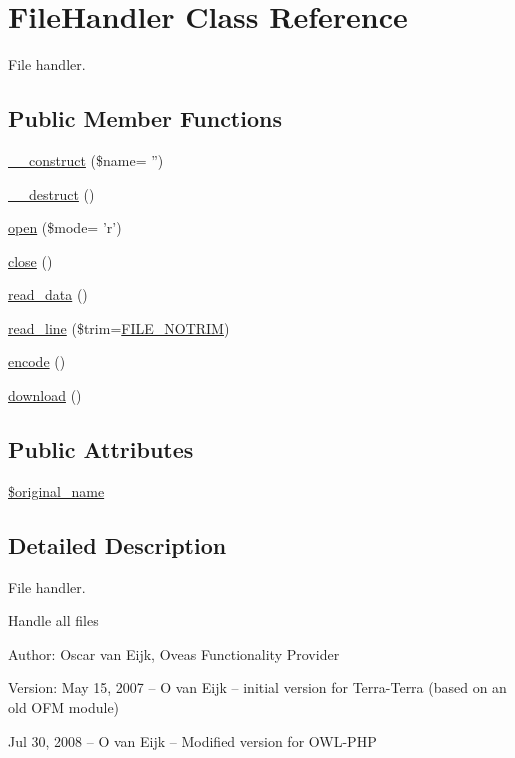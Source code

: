 \hypertarget{classFileHandler}{
\section{FileHandler Class Reference}
\label{classFileHandler}
}
File handler.  


\subsection*{Public Member Functions}
\begin{CompactItemize}
\item 
\hyperlink{classFileHandler_fe961e704bc637605512d72e6eb2ef82}{\_\-\_\-construct} (\$name= '')
\item 
\hyperlink{classFileHandler_734859e8962992da99dd8f853da5ae43}{\_\-\_\-destruct} ()
\item 
\hyperlink{classFileHandler_2a650b033c4eb1f98ba47fb05ce7b454}{open} (\$mode= 'r')
\item 
\hyperlink{classFileHandler_a48e7c3b67346e29b194d2f0ac5dd1f8}{close} ()
\item 
\hyperlink{classFileHandler_1389a6ea19a22471c301d70b5ed68ed8}{read\_\-data} ()
\item 
\hyperlink{classFileHandler_69f84a8138f717c84f560125f1f95448}{read\_\-line} (\$trim=\hyperlink{class_8filehandler_8php_3720f2e15eb9e16e29d8ecbb96763662}{FILE\_\-NOTRIM})
\item 
\hyperlink{classFileHandler_a29360bf94fd54d906256561f33d93ad}{encode} ()
\item 
\hyperlink{classFileHandler_c17edc9b92643c32ae6040b1235c64dd}{download} ()
\end{CompactItemize}
\subsection*{Public Attributes}
\begin{CompactItemize}
\item 
\hyperlink{classFileHandler_477708585850c3c8725ccf56bfe0b4a8}{\$original\_\-name}
\end{CompactItemize}


\subsection{Detailed Description}
File handler. 

Handle all files \begin{Desc}
\item[Author:]Oscar van Eijk, Oveas Functionality Provider \end{Desc}
\begin{Desc}
\item[Version:]May 15, 2007 -- O van Eijk -- initial version for Terra-Terra (based on an old OFM module) 

Jul 30, 2008 -- O van Eijk -- Modified version for OWL-PHP \end{Desc}


